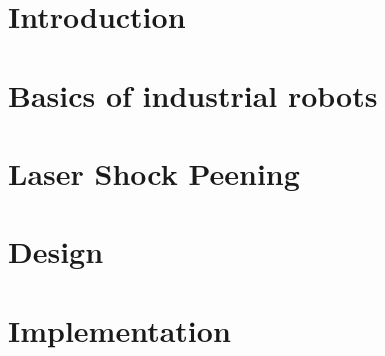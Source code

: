 \documentclass[a4paper,twoside,12pt]{book}
\renewcommand{\chaptermark}[1]{\markboth{#1}{#1}}
\begin{document}

\cleardoublepage
{}
\listoffigures

\cleardoublepage
{}
\listoftables


\chapter*{Introduction} %

\pagestyle{fancy}
\renewcommand{\chaptermark}[1]{\markboth{#1}{#1}}
\fancyhead[R]{\chaptername\ \thechapter\ --\ \leftmark}
\fancyhead[L]{}





\mainmatter

\chapter{Basics of industrial robots}



\chapter{Laser Shock Peening}

    

\chapter{Design}

    

\chapter{Implementation}
\end{document}
